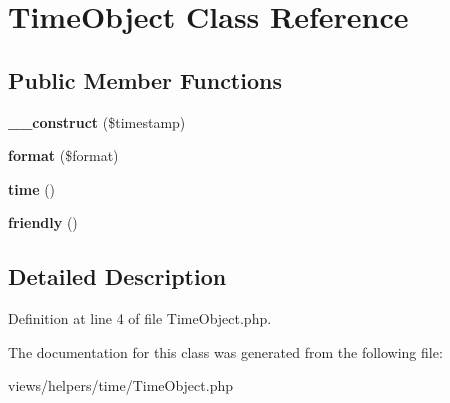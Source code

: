 \hypertarget{class_time_object}{
\section{TimeObject Class Reference}
\label{class_time_object}
}
\subsection*{Public Member Functions}
\begin{DoxyCompactItemize}
\item 
\hypertarget{class_time_object_a82b69b250dbddaed4c6e4020081c874d}{
{\bfseries \_\-\_\-construct} (\$timestamp)}
\label{class_time_object_a82b69b250dbddaed4c6e4020081c874d}

\item 
\hypertarget{class_time_object_a9283a42fba0d594e2546a552db92450d}{
{\bfseries format} (\$format)}
\label{class_time_object_a9283a42fba0d594e2546a552db92450d}

\item 
\hypertarget{class_time_object_a96b2fb3f116893b6940030ce956b365d}{
{\bfseries time} ()}
\label{class_time_object_a96b2fb3f116893b6940030ce956b365d}

\item 
\hypertarget{class_time_object_aecdb533b01a047a5b29f690494187734}{
{\bfseries friendly} ()}
\label{class_time_object_aecdb533b01a047a5b29f690494187734}

\end{DoxyCompactItemize}


\subsection{Detailed Description}


Definition at line 4 of file TimeObject.php.



The documentation for this class was generated from the following file:\begin{DoxyCompactItemize}
\item 
views/helpers/time/TimeObject.php\end{DoxyCompactItemize}
